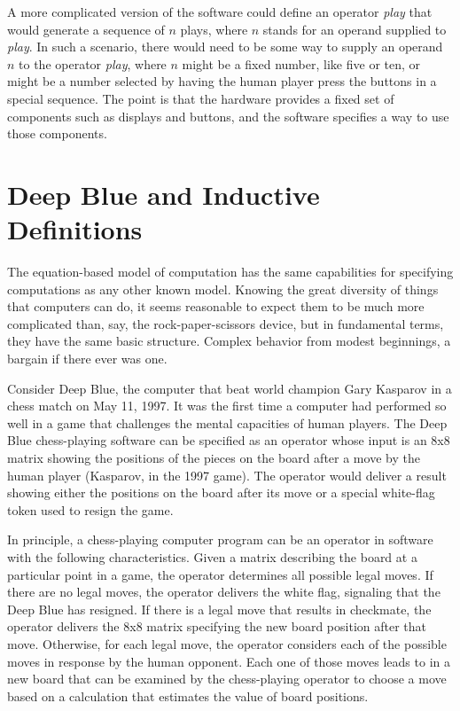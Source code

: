 A more complicated version of the software
could define an operator \textit{play} that would
generate a sequence of $n$ plays, where $n$ stands for
an operand supplied to \textit{play}.
In such a scenario, there would need to be some way to supply an operand $n$
to the operator \textit{play}, where $n$
might be a fixed number, like five or ten, or
might be a number selected by having the human
player press the buttons in a special sequence.
The point is that the hardware provides a fixed set of
components such as displays and buttons,
and the software specifies a way to use those components.

\section{Deep Blue and Inductive Definitions}

The equation-based model of computation has the same
capabilities for specifying computations
as any other known model. Knowing the great diversity of things that computers can do,
it seems reasonable to expect them to be much more complicated than,
say, the rock-paper-scissors device, but in fundamental terms,
they have the same basic structure.
Complex behavior from modest beginnings, a bargain if there ever was one.

Consider Deep Blue, the
computer that beat world champion Gary Kasparov in a chess match on May 11,
1997. It was the first time a computer had performed so well in a
game that challenges the mental capacities of human players.
The Deep Blue chess-playing software can be specified as an operator whose input is
an 8x8 matrix showing the positions of the pieces
on the board after a move by the human player (Kasparov, in the 1997 game).
The operator would deliver a result showing
either the positions on the board after its move or a special
white-flag token used to resign the game.

In principle, a chess-playing computer program can be an operator
in software with the following characteristics.
Given a matrix describing the board at a particular point in a game,
the operator determines all possible legal moves.  If there
are no legal moves, the operator delivers the white flag,
signaling that the Deep Blue has resigned.
If there is a legal move that results
in checkmate, the operator delivers the 8x8 matrix specifying the
new board position after that move.  Otherwise, for each legal move,
the operator considers
each of the possible moves in response by the human opponent.
Each one of those moves leads to in a new board that can be
examined by the chess-playing operator
to choose a move based on a calculation that estimates the value of
board positions.


